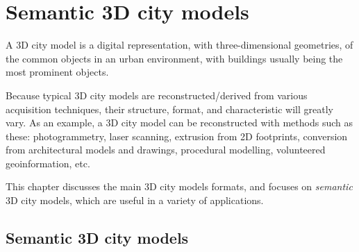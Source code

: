 
\setchapterpreamble[u]{\margintoc}

\graphicspath{{3dcm/}}

\chapter{Semantic 3D city models}%
\label{chap:3dcm}

A 3D city model is a digital representation,  with three-dimensional geometries, of the common objects in an urban environment, with buildings usually being the most prominent objects. 

Because typical 3D city models are reconstructed/derived from various acquisition techniques, their structure, format, and characteristic will greatly vary.
As an example, a 3D city model can be reconstructed with methods such as these: photogrammetry, laser scanning, extrusion from 2D footprints, conversion from architectural models and drawings, procedural modelling, volunteered geoinformation, etc.

This chapter discusses the main 3D city models formats, and focuses on \emph{semantic} 3D city models, 
which are useful in a variety of applications.


%
\section{Semantic 3D city models}

